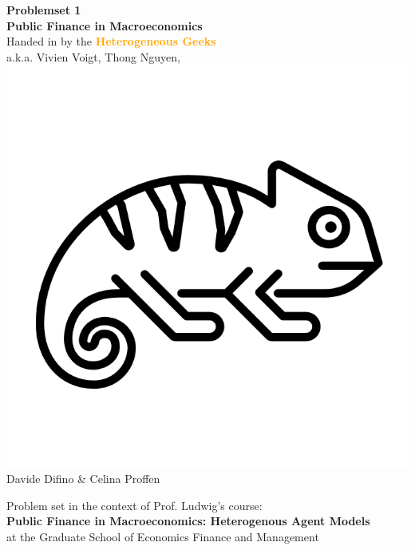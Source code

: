 \documentclass[12pt,a4paper]{article}
\begin{document}
\begin{center}
       \vspace*{1cm}
       \huge\textbf{Problemset 1} \\
       \vspace{0.4cm}
       \large \textbf{Public Finance in Macroeconomics} \\
       \vspace{0.5cm}
        \large Handed in by the \textcolor{orange}{\textbf{Heterogeneous Geeks}} \\ 
        \vspace{0.3cm}
        a.k.a. Vivien Voigt, Thong Nguyen, \includegraphics[scale=0.06]{geek.png}\\Davide Difino \& Celina Proffen \\
       \vspace{1.5cm}
       \vfill
       
       
        Problem set in the context of Prof. Ludwig's course: \\
        \textbf{Public Finance in Macroeconomics: Heterogenous Agent Models}\\
        at the Graduate School of Economics Finance and Management
       \vspace{0.8cm}
   \end{center}
\end{document}
